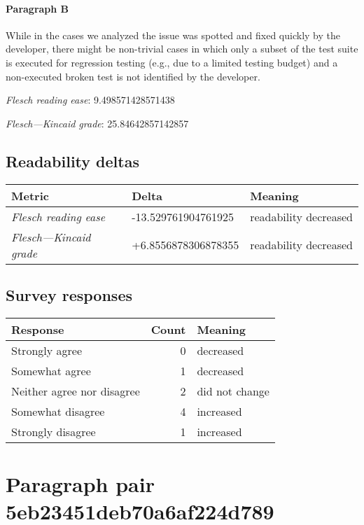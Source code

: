 \paragraph{Paragraph B}
While in the cases we analyzed the issue was spotted and fixed quickly by the developer, there might be non-trivial cases in which only a subset of the test suite is executed for regression testing (e.g., due to a limited testing budget) and a non-executed broken test is not identified by the developer.\par\medskip\emph{Flesch reading ease}: 9.498571428571438\par\emph{Flesch---Kincaid grade}: 25.84642857142857

\subsection{Readability deltas}

\begin{tabular}{lll}
\toprule
               \textbf{Metric} &       \textbf{Delta} &       \textbf{Meaning} \\
\midrule
    \emph{Flesch reading ease} &  -13.529761904761925 &  readability decreased \\
 \emph{Flesch---Kincaid grade} &  +6.8556878306878355 &  readability decreased \\
\bottomrule
\end{tabular}

\subsection{Survey responses}
\begin{tabular}{lrl}
\toprule
          \textbf{Response} &  \textbf{Count} & \textbf{Meaning} \\
\midrule
             Strongly agree &               0 &        decreased \\
             Somewhat agree &               1 &        decreased \\
 Neither agree nor disagree &               2 &   did not change \\
          Somewhat disagree &               4 &        increased \\
          Strongly disagree &               1 &        increased \\
\bottomrule
\end{tabular}

\section{Paragraph pair 5eb23451deb70a6af224d789}
